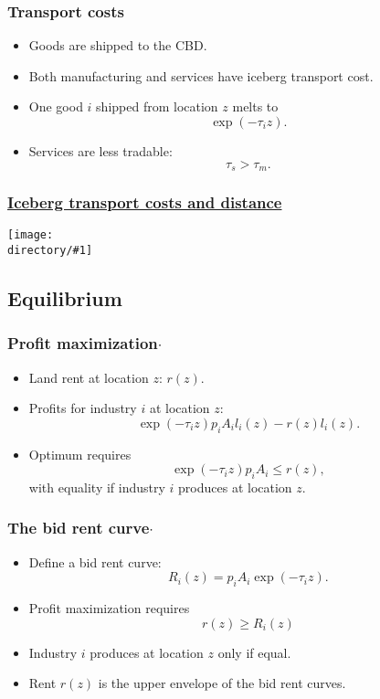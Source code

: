 \documentclass[compress,mathserif]{beamer}
\newcounter{perc}
\newcounter{percek}
\newcommand{\directory}{figures}
\newcommand{\widefigure}[2]{\begin{frame}\frametitle{\hyperlink{#1back}{#2}}\hypertarget{#1}{{\begin{center}\texttt{[image: \\directory/\#1]}\end{center}}}\end{frame}}
\renewcommand{\time}[1]{\addtocounter{percek}{#1}}
\begin{document}
\begin{frame}\frametitle{Transport costs}
\begin{itemize}
    \item Goods are shipped to the CBD.
    \item Both manufacturing and services have iceberg transport cost.
    \item One good $i$ shipped from location $z$ melts to
    \[
    \exp(-\tau_iz).
    \]
    \item Services are less tradable:
    \[
    \tau_s>\tau_m.
    \]
\end{itemize}
\end{frame}
\time{2}

\widefigure{Dz-exp}{Iceberg transport costs and distance}

\subsection{Equilibrium}

\begin{frame}\frametitle{Profit maximization$\cdot$}
\begin{itemize}
    \item Land rent at location $z$: $r(z)$.
    \item Profits for industry $i$ at location $z$:
    \[
    \exp(-\tau_i z) p_i A_i l_i(z) - r(z)l_i(z).
    \]
    \item Optimum requires
    \[
    \exp(-\tau_i z) p_i A_i \le r(z),
    \]
    with equality if industry $i$ produces at location $z$.
\end{itemize}
\end{frame}
\time{1}

\begin{frame}\frametitle{The bid rent curve$\cdot$}
\begin{itemize}
    \item Define a bid rent curve:
    \[
    R_i(z) = p_iA_i\exp(-\tau_i z).
    \]
    \item Profit maximization requires
    \[
    r(z)\ge R_i(z)
    \]
    \item Industry $i$ produces at location $z$ only if equal.
    \item Rent $r(z)$ is the upper envelope of the bid rent curves.
\end{itemize}
\end{frame}
\end{document}
